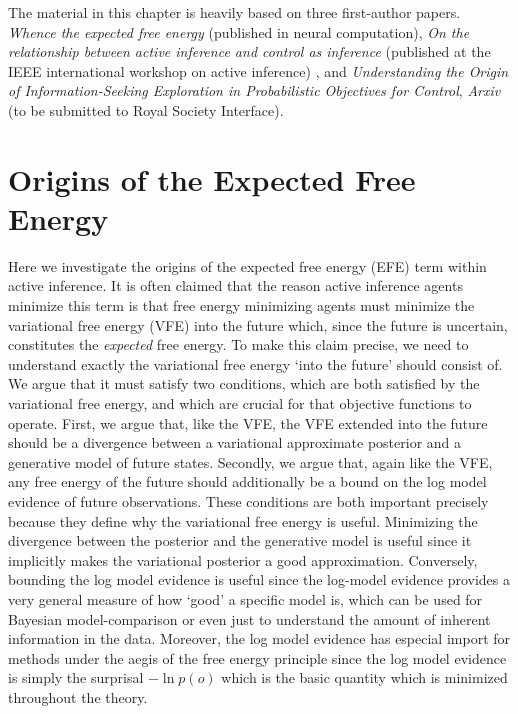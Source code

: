 The material in this chapter is heavily based on three first-author papers. \emph{Whence the expected free energy} \citep{millidge2020whence} (published in neural computation), \emph{On the relationship between active inference and control as inference} (published at the IEEE international workshop on active inference) \citep{millidge2020relationship}, and \citep{millidge2021understanding} \emph{Understanding the Origin of Information-Seeking Exploration in Probabilistic Objectives for Control}, \emph{Arxiv} (to be submitted to Royal Society Interface).

\section{Origins of the Expected Free Energy}

Here we investigate the origins of the expected free energy (EFE) term within active inference. It is often claimed that the reason active inference agents minimize this term is that free energy minimizing agents must minimize the variational free energy (VFE) into the future which, since the future is uncertain, constitutes the \emph{expected} free energy. To make this claim precise, we need to understand exactly the variational free energy `into the future' should consist of. We argue that it must satisfy two conditions, which are both satisfied by the variational free energy, and which are crucial for that objective functions to operate. First, we argue that, like the VFE, the VFE extended into the future should be a divergence between a variational approximate posterior and a generative model of future states. Secondly, we argue that, again like the VFE, any free energy of the future should additionally be a bound on the log model evidence of future observations. These conditions are both important precisely because they define why the variational free energy is useful. Minimizing the divergence between the posterior and the generative model is useful since it implicitly makes the variational posterior a good approximation. Conversely, bounding the log model evidence is useful since the log-model evidence provides a very general measure of how `good' a specific model is, which can be used for Bayesian model-comparison or even just to understand the amount of inherent information in the data. Moreover, the log model evidence has especial import for methods under the aegis of the free energy principle since the log model evidence is simply the surprisal $-\ln p(o)$ which is the basic quantity which is minimized throughout the theory.

